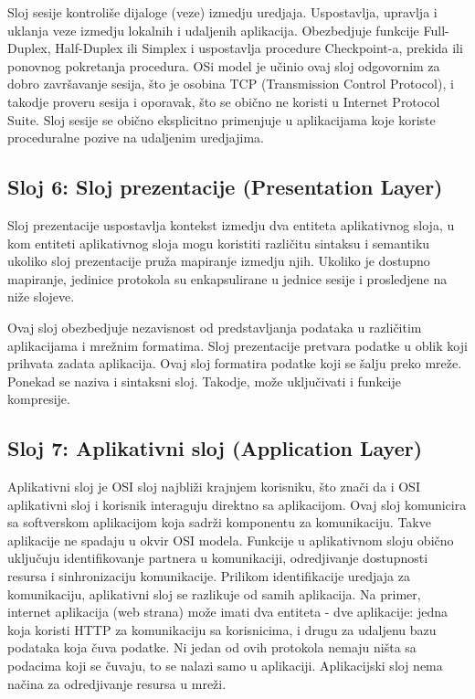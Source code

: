 \documentclass[a4paper,12pt, master]{etf}
\begin{document}
	Sloj sesije kontroli\v{s}e dijaloge (veze) izmedju uredjaja. Uspostavlja,
	upravlja i uklanja veze izmedju lokalnih i udaljenih aplikacija.
	Obezbedjuje funkcije Full-Duplex, Half-Duplex ili Simplex i uspostavlja
	procedure Checkpoint-a, prekida ili ponovnog pokretanja procedura. OSi
	model je u\v{c}inio ovaj sloj odgovornim za dobro zavr\v{s}avanje sesija,
	\v{s}to je osobina TCP (Transmission Control Protocol), i takodje proveru
	sesija i oporavak, \v{s}to se obi\v{c}no ne koristi u Internet Protocol
	Suite. Sloj sesije se obi\v{c}no eksplicitno primenjuje u aplikacijama koje
	koriste proceduralne pozive na udaljenim uredjajima.

	\subsection{Sloj 6: Sloj prezentacije (Presentation Layer)}

	Sloj prezentacije uspostavlja kontekst izmedju dva entiteta aplikativnog
	sloja, u kom entiteti aplikativnog sloja mogu koristiti razli\v{c}itu
	sintaksu i semantiku ukoliko sloj prezentacije pru\v{z}a mapiranje izmedju
	njih. Ukoliko je dostupno mapiranje, jedinice protokola su enkapsulirane u
	jednice sesije i prosledjene na ni\v{z}e slojeve.

	Ovaj sloj obezbedjuje nezavisnost od predstavljanja podataka u
	razli\v{c}itim aplikacijama i mre\v{z}nim formatima. Sloj prezentacije
	pretvara podatke u oblik koji prihvata zadata aplikacija. Ovaj sloj
	formatira podatke koji se \v{s}alju preko mre\v{z}e. Ponekad se naziva i
	sintaksni sloj.	Takodje, mo\v{z}e uklju\v{c}ivati i funkcije kompresije.

	\subsection{Sloj 7: Aplikativni sloj (Application Layer)}

	Aplikativni sloj je OSI sloj najbli\v{z}i krajnjem korisniku, \v{s}to
	zna\v{c}i da i OSI aplikativni sloj i korisnik interaguju direktno sa
	aplikacijom. Ovaj sloj komunicira sa softverskom aplikacijom koja
	sadr\v{z}i komponentu za komunikaciju. Takve aplikacije ne spadaju u okvir
	OSI modela.	Funkcije u aplikativnom sloju obi\v{c}no uklju\v{c}uju
	identifikovanje partnera u komunikaciji, odredjivanje dostupnosti resursa i
	sinhronizaciju komunikacije. Prilikom identifikacije uredjaja za
	komunikaciju, aplikativni sloj se razlikuje od samih aplikacija. Na primer,
	internet aplikacija (web strana) mo\v{z}e imati dva entiteta - dve
	aplikacije: jedna koja koristi HTTP za komunikaciju sa korisnicima, i drugu
	za udaljenu	bazu podataka koja \v{c}uva podatke. Ni jedan od ovih protokola
	nemaju ni\v{s}ta sa podacima koji se \v{c}uvaju, to se nalazi samo u
	aplikaciji. Aplikacijski sloj nema na\v{c}ina za odredjivanje resursa u
	mre\v{z}i.
\end{document}
